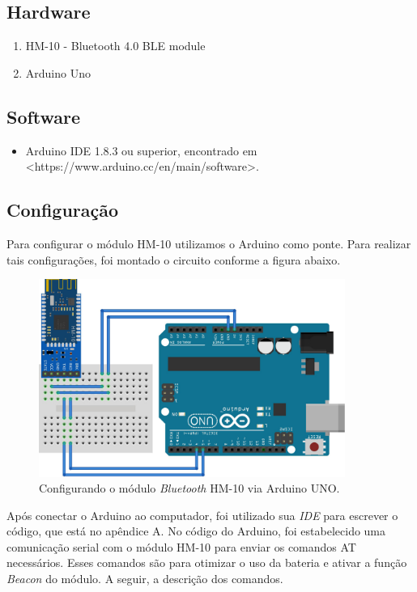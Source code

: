 \documentclass[
	12pt,				%
	oneside,			%
	a4paper,			%
	brazil				%
]{abntex2}
\begin{document}
{\subsection{Hardware}

\begin{enumerate}
\item HM-10 - Bluetooth 4.0 BLE module
\item Arduino Uno
\end{enumerate}

\subsection{Software}

\begin{itemize}
\item Arduino IDE 1.8.3 ou superior, encontrado em <https://www.arduino.cc/en/main/software>. 
\end{itemize}

\subsection{Configuração}

Para configurar o módulo HM-10 utilizamos o Arduino como ponte. Para realizar tais configurações, foi montado o circuito conforme a figura abaixo.

\begin{figure}[!h]
\centering
\includegraphics[width=10cm, center]{images/arduino-hm10}
\caption{Configurando o módulo \textit{Bluetooth} HM-10 via Arduino UNO.}
\label{Rotulo}
\end{figure}

Após conectar o Arduino ao computador, foi utilizado sua \textit{IDE} para escrever o código, que está no apêndice A. No código do Arduino, foi estabelecido uma comunicação serial com o módulo HM-10 para enviar os comandos AT necessários. Esses comandos são para otimizar o uso da bateria e ativar a função \textit{Beacon} do módulo. A seguir, a descrição dos comandos.

}
\end{document}
